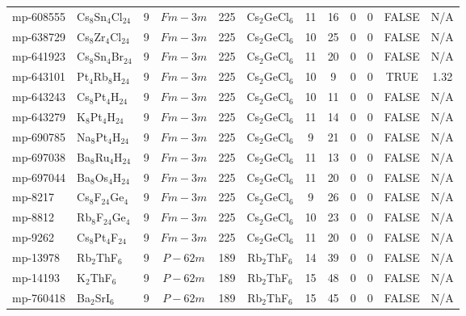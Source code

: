 {\begin{longtable}{llcccccccccc}
    mp-608555 & Cs$_{8}$Sn$_{4}$Cl$_{24}$ & 9     & $Fm-3m$ & 225   & Cs$_{2}$GeCl$_{6}$ & 11    & 16    & 0     & 0     & FALSE & N/A \\
    mp-638729 & Cs$_{8}$Zr$_{4}$Cl$_{24}$ & 9     & $Fm-3m$ & 225   & Cs$_{2}$GeCl$_{6}$ & 10    & 25    & 0     & 0     & FALSE & N/A \\
    mp-641923 & Cs$_{8}$Sn$_{4}$Br$_{24}$ & 9     & $Fm-3m$ & 225   & Cs$_{2}$GeCl$_{6}$ & 11    & 20    & 0     & 0     & FALSE & N/A \\
    mp-643101 & Pt$_{4}$Rb$_{8}$H$_{24}$ & 9     & $Fm-3m$ & 225   & Cs$_{2}$GeCl$_{6}$ & 10    & 9     & 0     & 0     & TRUE  & 1.32  \\
    mp-643243 & Cs$_{8}$Pt$_{4}$H$_{24}$ & 9     & $Fm-3m$ & 225   & Cs$_{2}$GeCl$_{6}$ & 10    & 11    & 0     & 0     & FALSE & N/A \\
    mp-643279 & K$_{8}$Pt$_{4}$H$_{24}$ & 9     & $Fm-3m$ & 225   & Cs$_{2}$GeCl$_{6}$ & 11    & 14    & 0     & 0     & FALSE & N/A \\
    mp-690785 & Na$_{8}$Pt$_{4}$H$_{24}$ & 9     & $Fm-3m$ & 225   & Cs$_{2}$GeCl$_{6}$ & 9     & 21    & 0     & 0     & FALSE & N/A \\
    mp-697038 & Ba$_{8}$Ru$_{4}$H$_{24}$ & 9     & $Fm-3m$ & 225   & Cs$_{2}$GeCl$_{6}$ & 11    & 13    & 0     & 0     & FALSE & N/A \\
    mp-697044 & Ba$_{8}$Os$_{4}$H$_{24}$ & 9     & $Fm-3m$ & 225   & Cs$_{2}$GeCl$_{6}$ & 11    & 20    & 0     & 0     & FALSE & N/A \\
    mp-8217 & Cs$_{8}$F$_{24}$Ge$_{4}$ & 9     & $Fm-3m$ & 225   & Cs$_{2}$GeCl$_{6}$ & 9     & 26    & 0     & 0     & FALSE & N/A \\
    mp-8812 & Rb$_{8}$F$_{24}$Ge$_{4}$ & 9     & $Fm-3m$ & 225   & Cs$_{2}$GeCl$_{6}$ & 10    & 23    & 0     & 0     & FALSE & N/A \\
    mp-9262 & Cs$_{8}$Pt$_{4}$F$_{24}$ & 9     & $Fm-3m$ & 225   & Cs$_{2}$GeCl$_{6}$ & 11    & 20    & 0     & 0     & FALSE & N/A \\
    mp-13978 & Rb$_{2}$ThF$_{6}$ & 9     & $P-62m$ & 189   & Rb$_{2}$ThF$_{6}$ & 14    & 39    & 0     & 0     & FALSE & N/A \\
    mp-14193 & K$_{2}$ThF$_{6}$ & 9     & $P-62m$ & 189   & Rb$_{2}$ThF$_{6}$ & 15    & 48    & 0     & 0     & FALSE & N/A \\
    mp-760418 & Ba$_{2}$SrI$_{6}$ & 9     & $P-62m$ & 189   & Rb$_{2}$ThF$_{6}$ & 15    & 45    & 0     & 0     & FALSE & N/A \\

\end{longtable}}
